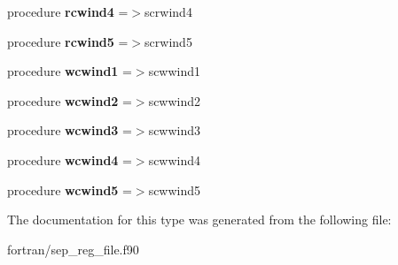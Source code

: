 \begin{DoxyCompactItemize}
procedure {\bfseries rcwind4} =$>$scrwind4
\item 
\mbox{\label{structsep__regfile__mod_1_1sepfile_acba514edbeaf19a3d4e40d3126ff5f80}} 
procedure {\bfseries rcwind5} =$>$scrwind5
\item 
\mbox{\label{structsep__regfile__mod_1_1sepfile_ad7061e343f064235f0f96463128197be}} 
procedure {\bfseries wcwind1} =$>$scwwind1
\item 
\mbox{\label{structsep__regfile__mod_1_1sepfile_a43899f86706bd1c0b890d9d90277322e}} 
procedure {\bfseries wcwind2} =$>$scwwind2
\item 
\mbox{\label{structsep__regfile__mod_1_1sepfile_a9074053f8df3c5c01f8dd5132d478604}} 
procedure {\bfseries wcwind3} =$>$scwwind3
\item 
\mbox{\label{structsep__regfile__mod_1_1sepfile_a9c39c8dea4f585d2f0e0e751e86498cb}} 
procedure {\bfseries wcwind4} =$>$scwwind4
\item 
\mbox{\label{structsep__regfile__mod_1_1sepfile_a753f26f926f7c8649db0e1ddd2c0dbf3}} 
procedure {\bfseries wcwind5} =$>$scwwind5
\end{DoxyCompactItemize}


The documentation for this type was generated from the following file\+:\begin{DoxyCompactItemize}
\item 
fortran/sep\+\_\+reg\+\_\+file.\+f90\end{DoxyCompactItemize}
